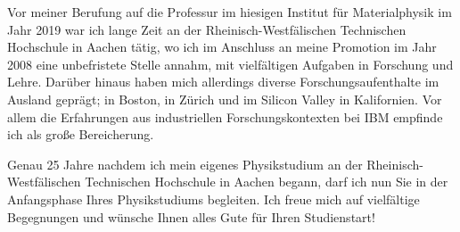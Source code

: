 \begin{multicols}{2}
Vor meiner Berufung auf die Professur im hiesigen Institut für Materialphysik im Jahr 2019 war ich lange Zeit an der Rheinisch-Westfälischen Technischen Hochschule in Aachen tätig, wo ich im Anschluss an meine Promotion im Jahr 2008 eine unbefristete Stelle annahm, mit vielfältigen Aufgaben in Forschung und Lehre. Darüber hinaus haben mich allerdings diverse Forschungsaufenthalte im Ausland geprägt; in Boston, in Zürich und im Silicon Valley in Kalifornien. Vor allem die Erfahrungen aus industriellen Forschungskontexten bei IBM empfinde ich als große Bereicherung. 
 
Genau 25 Jahre nachdem ich mein eigenes Physikstudium an der Rheinisch-Westfälischen Technischen Hochschule in Aachen begann, darf ich nun Sie in der Anfangsphase Ihres Physikstudiums begleiten. Ich freue mich auf vielfältige Begegnungen und wünsche Ihnen alles Gute für Ihren Studienstart!


\end{multicols}

\begin{center}
\end{center}

\vfill

\newpage

